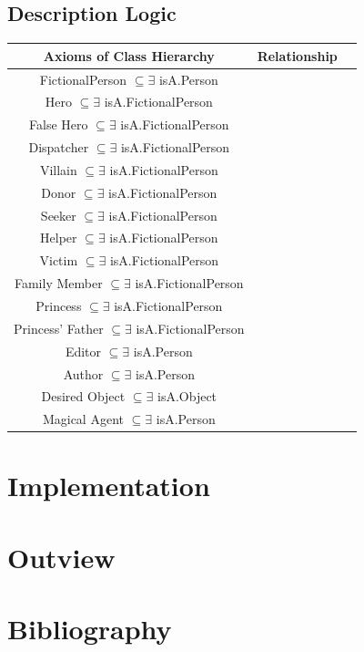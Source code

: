 \documentclass[10pt,a4paper]{article}
\begin{document}
\subsection{Description Logic}

\begin{tabular}{c|c|c}
Axioms of Class Hierarchy & Relationship & \\
\hline
FictionalPerson $\subseteq \exists $ isA.Person  & & \\
Hero $\subseteq \exists $ isA.FictionalPerson  & & \\
False Hero $\subseteq \exists $ isA.FictionalPerson  & & \\

Dispatcher $\subseteq \exists $ isA.FictionalPerson  & & \\
Villain $\subseteq \exists $ isA.FictionalPerson  & & \\
Donor $\subseteq \exists $ isA.FictionalPerson  & & \\
Seeker $\subseteq \exists $ isA.FictionalPerson  & & \\
Helper $\subseteq \exists $ isA.FictionalPerson  & & \\
Victim $\subseteq \exists $ isA.FictionalPerson  & & \\
Family Member $\subseteq \exists $ isA.FictionalPerson  & & \\
Princess $\subseteq \exists $ isA.FictionalPerson  & & \\
Princess' Father $\subseteq \exists $ isA.FictionalPerson  & & \\
Editor $\subseteq \exists $ isA.Person  & & \\
Author $\subseteq \exists $ isA.Person  & & \\
Desired Object $\subseteq \exists $ isA.Object  & & \\
Magical Agent $\subseteq \exists $ isA.Person  & & \\



\end{tabular} 


\section{Implementation}
\section{Outview}
\section{Bibliography}
 

\end{document}
